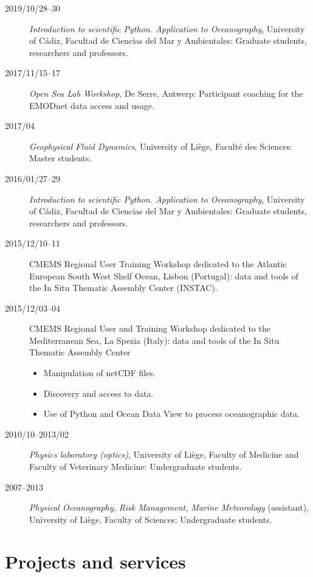 \documentclass[11pt,a4paper,svgnames]{article}
\begin{document}
\begin{description}

\item[2019/10/28--30] \textit{Introduction to scientific Python. Application to Oceanography}, University of C\'{a}diz, Facultad de Ciencias del Mar y Ambientales: Graduate students, researchers and professors.

\item[2017/11/15--17] \textit{Open Sea Lab Workshop}, De Serre, Antwerp: Participant coaching for the EMODnet data access and usage.

\item[2017/04] \textit{Geophysical Fluid Dynamics}, University of Li\`{e}ge, Facult\'{e} des Sciences: Master students.

\item[2016/01/27--29] \textit{Introduction to scientific Python. Application to Oceanography}, University of C\'{a}diz, Facultad de Ciencias del Mar y Ambientales: Graduate students, researchers and professors.

\item[2015/12/10--11] CMEMS Regional User Training Workshop dedicated to the Atlantic European South West Shelf Ocean, Lisbon (Portugal): data and tools of the In Situ Thematic Assembly Center (INSTAC). 
\item[2015/12/03--04] CMEMS Regional User and Training Workshop dedicated to the Mediterranean Sea, La Spezia (Italy): data and tools of the In Situ Thematic Assembly Center
\begin{itemize}
\item Manipulation of netCDF files.
\item Discovery and access to data.
\item Use of Python and Ocean Data View to process oceanographic data.
\end{itemize}
\item[2010/10--2013/02] \textit{Physics laboratory (optics)}, University of Li\`{e}ge, Faculty of Medicine and Faculty of Veterinary Medicine: Undergraduate students.
\item[2007--2013] \textit{Physical Oceanography, Risk Management, Marine Meteorology} (assistant), University of Li\`{e}ge, Faculty of Sciences: Undergraduate students.

\end{description}


\section{Projects and services}
\end{document}
